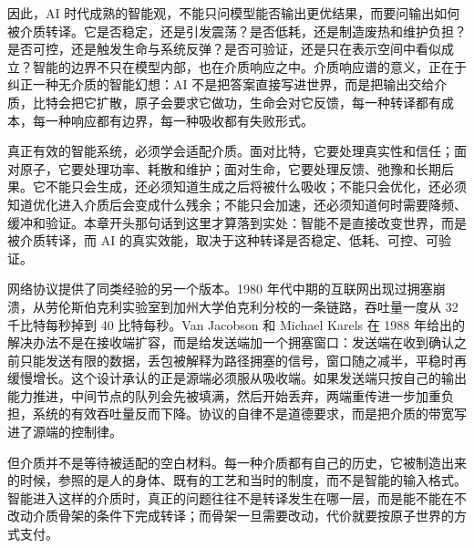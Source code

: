 
因此，AI 时代成熟的智能观，不能只问模型能否输出更优结果，而要问输出如何被介质转译。它是否稳定，还是引发震荡？是否低耗，还是制造废热和维护负担？是否可控，还是触发生命与系统反弹？是否可验证，还是只在表示空间中看似成立？智能的边界不只在模型内部，也在介质响应之中。介质响应谱的意义，正在于纠正一种无介质的智能幻想：AI 不是把答案直接写进世界，而是把输出交给介质，比特会把它扩散，原子会要求它做功，生命会对它反馈，每一种转译都有成本，每一种响应都有边界，每一种吸收都有失败形式。

真正有效的智能系统，必须学会适配介质。面对比特，它要处理真实性和信任；面对原子，它要处理功率、耗散和维护；面对生命，它要处理反馈、弛豫和长期后果。它不能只会生成，还必须知道生成之后将被什么吸收；不能只会优化，还必须知道优化进入介质后会变成什么残余；不能只会加速，还必须知道何时需要降频、缓冲和验证。本章开头那句话到这里才算落到实处：智能不是直接改变世界，而是被介质转译，而 AI 的真实效能，取决于这种转译是否稳定、低耗、可控、可验证。

网络协议提供了同类经验的另一个版本。1980 年代中期的互联网出现过拥塞崩溃，从劳伦斯伯克利实验室到加州大学伯克利分校的一条链路，吞吐量一度从 32 千比特每秒掉到 40 比特每秒。Van Jacobson 和 Michael Karels 在 1988 年给出的解决办法不是在接收端扩容，而是给发送端加一个拥塞窗口：发送端在收到确认之前只能发送有限的数据，丢包被解释为路径拥塞的信号，窗口随之减半，平稳时再缓慢增长\cite{jacobson1988}。这个设计承认的正是源端必须服从吸收端。如果发送端只按自己的输出能力推进，中间节点的队列会先被填满，然后开始丢弃，两端重传进一步加重负担，系统的有效吞吐量反而下降。协议的自律不是道德要求，而是把介质的带宽写进了源端的控制律。

但介质并不是等待被适配的空白材料。每一种介质都有自己的历史，它被制造出来的时候，参照的是人的身体、既有的工艺和当时的制度，而不是智能的输入格式。智能进入这样的介质时，真正的问题往往不是转译发生在哪一层，而是能不能在不改动介质骨架的条件下完成转译；而骨架一旦需要改动，代价就要按原子世界的方式支付。
